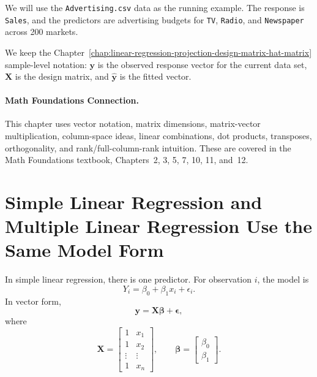We will use the \texttt{Advertising.csv} data as the running example.  The response is \texttt{Sales}, and the predictors are advertising budgets for \texttt{TV}, \texttt{Radio}, and \texttt{Newspaper} across 200 markets.

We keep the Chapter~\ref{chap:linear-regression-projection-design-matrix-hat-matrix} sample-level notation: \(\mathbf{y}\) is the observed response vector for the current data set, \(\mathbf{X}\) is the design matrix, and \(\widehat{\mathbf{y}}\) is the fitted vector.

\paragraph{Math Foundations Connection.}
This chapter uses vector notation, matrix dimensions, matrix-vector multiplication, column-space ideas, linear combinations, dot products, transposes, orthogonality, and rank/full-column-rank intuition.  These are covered in the Math Foundations textbook, Chapters~2, 3, 5, 7, 10, 11, and~12.

\section{Simple Linear Regression and Multiple Linear Regression Use the Same Model Form}

In simple linear regression, there is one predictor.  For observation \(i\), the model is
\begin{equation}
  Y_i=\beta_0+\beta_1x_i+\epsilon_i.
\end{equation}
In vector form,
\begin{equation}
  \mathbf{y}=\mathbf{X}\boldsymbol{\beta}+\boldsymbol{\epsilon},
\end{equation}
where
\begin{equation}
  \mathbf{X}=\begin{bmatrix}
    1 & x_1\\
    1 & x_2\\
    \vdots & \vdots\\
    1 & x_n
  \end{bmatrix},
  \qquad
  \boldsymbol{\beta}=\begin{bmatrix}\beta_0\\\beta_1\end{bmatrix}.
\end{equation}

